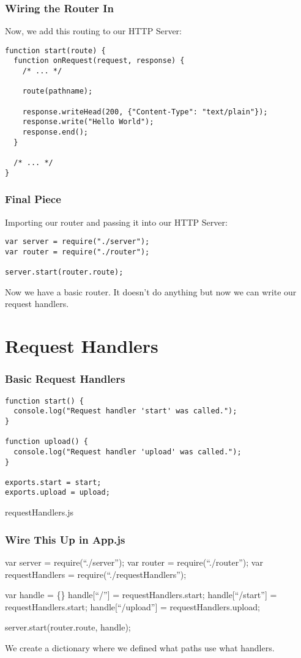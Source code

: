 \documentclass[ignorenonframetext,]{beamer}
\begin{document}
\begin{frame}[fragile]\frametitle{Wiring the Router In}

Now, we add this routing to our HTTP Server:

\begin{verbatim}
function start(route) {
  function onRequest(request, response) {
    /* ... */

    route(pathname);

    response.writeHead(200, {"Content-Type": "text/plain"});
    response.write("Hello World");
    response.end();
  }

  /* ... */
}
\end{verbatim}
\end{frame}

\begin{frame}[fragile]\frametitle{Final Piece}

Importing our router and passing it into our HTTP Server:

\begin{verbatim}
var server = require("./server");
var router = require("./router");

server.start(router.route);
\end{verbatim}
Now we have a basic router. It doesn't do anything but now we can write
our request handlers.

\end{frame}

\section{Request Handlers}

\begin{frame}[fragile]\frametitle{Basic Request Handlers}

\begin{verbatim}
function start() {
  console.log("Request handler 'start' was called.");
}

function upload() {
  console.log("Request handler 'upload' was called.");
}

exports.start = start;
exports.upload = upload;
\end{verbatim}
requestHandlers.js

\end{frame}

\begin{frame}\frametitle{Wire This Up in App.js}

var server = require(``./server''); var router = require(``./router'');
var requestHandlers = require(``./requestHandlers'');

var handle = \{\} handle{[}``/''{]} = requestHandlers.start;
handle{[}``/start''{]} = requestHandlers.start; handle{[}``/upload''{]}
= requestHandlers.upload;

server.start(router.route, handle);

We create a dictionary where we defined what paths use what handlers.

\end{frame}
\end{document}
